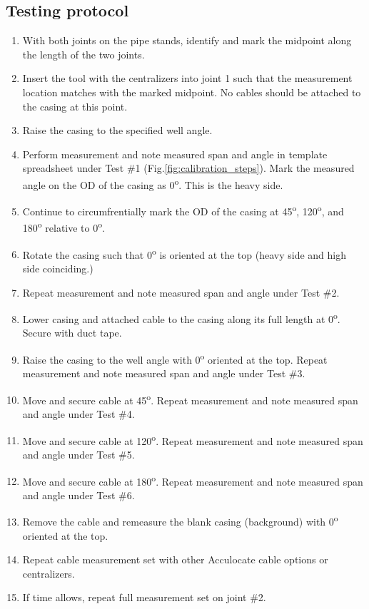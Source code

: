\documentclass[paper=a4, fontsize=11pt]{scrartcl}
\numberwithin{equation}{section}		%
\numberwithin{figure}{section}			%
\numberwithin{table}{section}				%
\begin{document}
\subsection{Testing protocol}
\begin{enumerate}
    \item With both joints on the pipe stands, identify and mark the midpoint along the length of the two joints.
    \item Insert the tool with the centralizers into joint 1 such that the measurement location matches with the marked midpoint.  No cables should be attached to the casing at this point.
    \item Raise the casing to the specified well angle.
    \item Perform measurement and note measured span and angle in template spreadsheet under Test {\#}1 (Fig.\ref{fig:calibration_steps}).  Mark the measured angle on the OD of the casing as 0\textsuperscript{o}.  This is the heavy side.  
    \item Continue to circumfrentially mark the OD of the casing at 45\textsuperscript{o}, 120\textsuperscript{o}, and 180\textsuperscript{o} relative to 0\textsuperscript{o}.
    \item Rotate the casing such that 0\textsuperscript{o} is oriented at the top (heavy side and high side coinciding.)
    \item Repeat measurement and note measured span and angle under Test {\#}2.
    \item Lower casing and attached cable to the casing along its full length  at 0\textsuperscript{o}.  Secure with duct tape.
    \item Raise the casing to the well angle with 0\textsuperscript{o} oriented at the top. Repeat measurement and note measured span and angle under Test {\#}3.
    \item Move and secure cable at 45\textsuperscript{o}.  Repeat measurement and note measured span and angle under Test {\#}4.
    \item Move and secure cable at 120\textsuperscript{o}.  Repeat measurement and note measured span and angle under Test {\#}5.
    \item Move and secure cable at 180\textsuperscript{o}.  Repeat measurement and note measured span and angle under Test {\#}6.
    \item Remove the cable and remeasure the blank casing (background) with 0\textsuperscript{o} oriented at the top.
    \item Repeat cable measurement set with other Acculocate cable options or centralizers.
    \item If time allows, repeat full measurement set on joint \#2.
\end{enumerate}
\end{document}
